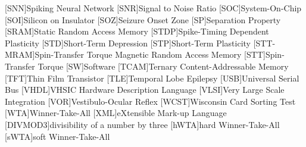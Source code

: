 [SNN]{Spiking Neural Network}
[SNR]{Signal to Noise Ratio}
[SOC]{System-On-Chip}
[SOI]{Silicon on Insulator}
[SOZ]{Seizure Onset Zone}
[SP]{Separation Property}
[SRAM]{Static Random Access Memory}
[STDP]{Spike-Timing Dependent Plasticity}
[STD]{Short-Term Depression}
[STP]{Short-Term Plasticity}
[STT-MRAM]{Spin-Transfer Torque Magnetic Random Access Memory}
[STT]{Spin-Transfer Torque}
[SW]{Software}
[TCAM]{Ternary Content-Addressable Memory}
[TFT]{Thin Film Transistor}
[TLE]{Temporal Lobe Epilepsy}
[USB]{Universal Serial Bus}
[VHDL]{VHSIC Hardware Description Language}
[VLSI]{Very Large Scale Integration}
[VOR]{Vestibulo-Ocular Reflex}
[WCST]{Wisconsin Card Sorting Test}
[WTA]{Winner-Take-All}
[XML]{eXtensible Mark-up Language}
[DIVMOD3]{divisibility of a number by three}
[hWTA]{hard Winner-Take-All}
[sWTA]{soft Winner-Take-All}
